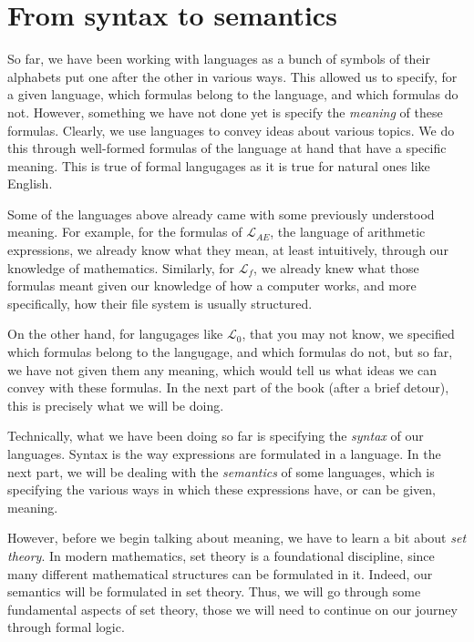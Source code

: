 \section{From syntax to semantics}

So far, we have been working with languages as a bunch of symbols of their alphabets put one after the other in various ways. This allowed us to specify, for a given language, which formulas belong to the language, and which formulas do not. However, something we have not done yet is specify the \textit{meaning} of these formulas. Clearly, we use languages to convey ideas about various topics. We do this through well-formed formulas of the language at hand that have a specific meaning. This is true of formal langugages as it is true for natural ones like English. 

Some of the languages above already came with some previously understood meaning. For example, for the formulas of $\mathcal{L}_{AE}$, the language of arithmetic expressions, we already know what they mean, at least intuitively, through our knowledge of mathematics. Similarly, for $\mathcal{L}_f$, we already knew what those formulas meant given our knowledge of how a computer works, and more specifically, how their file system is usually structured. 

On the other hand, for langugages like $\mathcal{L}_0$, that you may not know, we specified which formulas belong to the langugage, and which formulas do not, but so far, we have not given them any meaning, which would tell us what ideas we can convey with these formulas. In the next part of the book (after a brief detour), this is precisely what we will be doing. 

Technically, what we have been doing so far is specifying the \textit{syntax} of our languages. Syntax is the way expressions are formulated in a language. In the next part, we will be dealing with the \textit{semantics} of some languages, which is specifying the various ways in which these expressions have, or can be given, meaning. 

However, before we begin talking about meaning, we have to learn a bit about \textit{set theory}. In modern mathematics, set theory is a foundational discipline, since many different mathematical structures can be formulated in it. Indeed, our semantics will be formulated in set theory. Thus, we will go through some fundamental aspects of set theory, those we will need to continue on our journey through formal logic. 